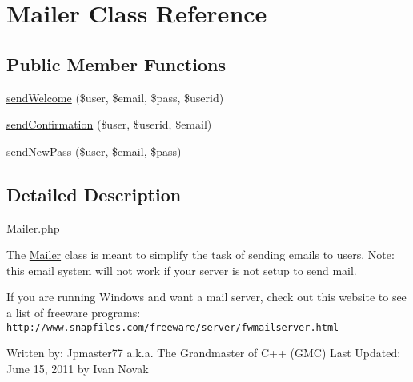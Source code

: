 \hypertarget{class_mailer}{\section{Mailer Class Reference}
\label{class_mailer}
}
\subsection*{Public Member Functions}
\begin{DoxyCompactItemize}
\item 
\hyperlink{class_mailer_a1636e334cc144b77045a4211825b1108}{send\-Welcome} (\$user, \$email, \$pass, \$userid)
\item 
\hyperlink{class_mailer_a54ab908230a26d272d9ec0544c94703b}{send\-Confirmation} (\$user, \$userid, \$email)
\item 
\hyperlink{class_mailer_a97be2ba9193174f321abba5581711717}{send\-New\-Pass} (\$user, \$email, \$pass)
\end{DoxyCompactItemize}


\subsection{Detailed Description}
Mailer.\-php

The \hyperlink{class_mailer}{Mailer} class is meant to simplify the task of sending emails to users. Note\-: this email system will not work if your server is not setup to send mail.

If you are running Windows and want a mail server, check out this website to see a list of freeware programs\-: \href{http://www.snapfiles.com/freeware/server/fwmailserver.html}{\tt http\-://www.\-snapfiles.\-com/freeware/server/fwmailserver.\-html}

Written by\-: Jpmaster77 a.\-k.\-a. The Grandmaster of C++ (G\-M\-C) Last Updated\-: June 15, 2011 by Ivan Novak 

